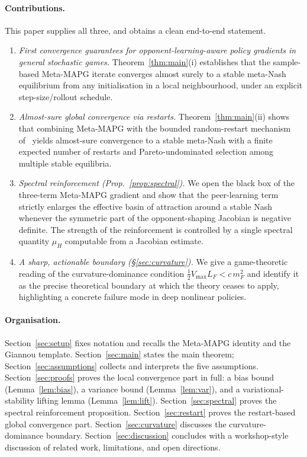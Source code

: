 \documentclass[11pt]{article}
\theoremstyle{definition}
\theoremstyle{remark}
\begin{document}
\paragraph{Contributions.}
This paper supplies all three, and obtains a clean end-to-end
statement.
\begin{enumerate}[leftmargin=1.4em,itemsep=2pt]
\item \emph{First convergence guarantees for opponent-learning-aware
      policy gradients in general stochastic games.}
      Theorem~\ref{thm:main}(i) establishes that the sample-based
      Meta-MAPG iterate converges almost surely to a stable meta-Nash
      equilibrium from any initialisation in a local neighbourhood,
      under an explicit step-size/rollout schedule.
\item \emph{Almost-sure global convergence via restarts.}
      Theorem~\ref{thm:main}(ii) shows that combining Meta-MAPG with
      the bounded random-restart mechanism
      of~\citet[\S4]{giannou2022convergence} yields almost-sure
      convergence to a stable meta-Nash with a finite expected number
      of restarts and Pareto-undominated selection among multiple
      stable equilibria.
\item \emph{Spectral reinforcement (Prop.~\ref{prop:spectral}).}
      We open the black box of the three-term Meta-MAPG gradient and
      show that the peer-learning term strictly enlarges the effective
      basin of attraction around a stable Nash whenever the symmetric
      part of the opponent-shaping Jacobian is negative definite.
      The strength of the reinforcement is controlled by a single
      spectral quantity $\mu_H$ computable from a Jacobian estimate.
\item \emph{A sharp, actionable boundary (\S\ref{sec:curvature}).}
      We give a game-theoretic reading of the
      curvature-dominance condition $\tfrac{1}{2}V_{\max}L_F<c\,m_F^2$
      and identify it as the precise theoretical boundary at which the
      theory ceases to apply, highlighting a concrete failure mode in
      deep nonlinear policies.
\end{enumerate}

\paragraph{Organisation.}
Section~\ref{sec:setup} fixes notation and recalls the Meta-MAPG
identity and the Giannou template.  Section~\ref{sec:main} states the
main theorem; Section~\ref{sec:assumptions} collects and interprets
the five assumptions.  Section~\ref{sec:proofs} proves the local
convergence part in full: a bias bound (Lemma~\ref{lem:bias}), a
variance bound (Lemma~\ref{lem:var}), and a variational-stability
lifting lemma (Lemma~\ref{lem:lift}).  Section~\ref{sec:spectral}
proves the spectral reinforcement proposition.
Section~\ref{sec:restart} proves the restart-based global convergence
part.  Section~\ref{sec:curvature} discusses the curvature-dominance
boundary.  Section~\ref{sec:discussion} concludes with a workshop-style
discussion of related work, limitations, and open directions.
\end{document}
